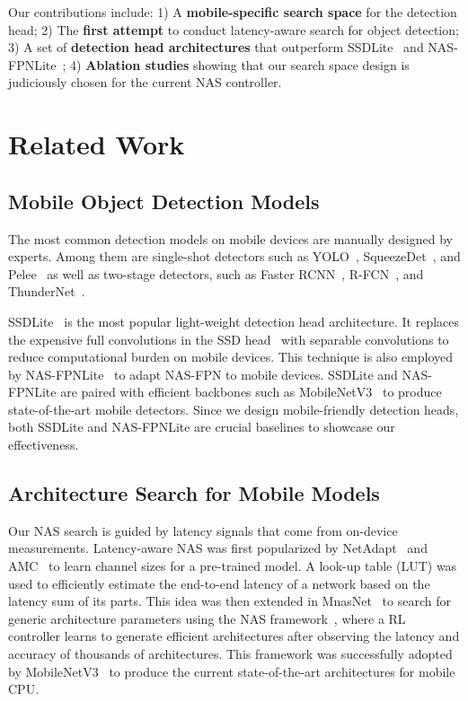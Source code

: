 \documentclass[10pt,twocolumn,letterpaper]{article}
\begin{document}
Our contributions include:
1) A {\bf mobile-specific search space} for the detection head;
2) The {\bf first attempt} to conduct latency-aware search for object detection;
3) A set of {\bf detection head architectures} that outperform SSDLite~\cite{sandler2018mobilenetv2} and NAS-FPNLite~\cite{ghiasi2019fpn};
4) {\bf Ablation studies} showing that our search space design is judiciously chosen for the current NAS controller. 







  
\section{Related Work}
\subsection{Mobile Object Detection Models}
The most common detection models on mobile devices are manually designed by experts. Among them are single-shot detectors such as YOLO~\cite{redmon2016you}, SqueezeDet~\cite{wu2017squeezedet}, and Pelee~\cite{wang2018pelee} as well as two-stage detectors, such as Faster RCNN~\cite{ren2015faster}, R-FCN~\cite{dai2016r}, and ThunderNet~\cite{qin2019thundernet}.

SSDLite~\cite{sandler2018mobilenetv2} is the most popular light-weight detection head architecture. It replaces the expensive  full convolutions in the SSD head~\cite{liu2016ssd} with separable convolutions to reduce computational burden on mobile devices. This technique is also employed by NAS-FPNLite~\cite{ghiasi2019fpn} to adapt NAS-FPN to mobile devices. SSDLite and NAS-FPNLite are paired with efficient backbones such as MobileNetV3~\cite{howard2019searching} to produce state-of-the-art mobile detectors. Since we design mobile-friendly detection heads, both SSDLite and NAS-FPNLite are crucial baselines to showcase our effectiveness.


\subsection{Architecture Search for Mobile Models}
Our NAS search is guided by latency signals that come from on-device measurements. Latency-aware NAS was first popularized by NetAdapt~\cite{yang2018netadapt} and AMC~\cite{he2018amc} to learn channel sizes for a pre-trained model. A look-up table (LUT) was used to efficiently estimate the end-to-end latency of a network based on the latency sum of its parts. This idea was then extended in MnasNet~\cite{tan2019mnasnet} to search for generic architecture parameters using the NAS framework~\cite{zoph2016neural}, where a RL controller learns to generate efficient architectures after observing the latency and accuracy of thousands of architectures. This framework was successfully adopted by MobileNetV3~\cite{howard2019searching} to produce the current state-of-the-art architectures for mobile CPU.  
\end{document}

